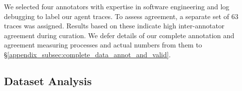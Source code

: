 \documentclass[11pt]{article}
\begin{document}
We selected four annotators with expertise in software engineering and log debugging to label our agent traces. To assess agreement, a separate set of 63 traces was assigned. Results based on these indicate high inter-annotator agreement during curation. We defer details of our complete annotation and agreement measuring processes and actual numbers from them to \S\ref{appendix_subsec:complete_data_annot_and_valid}.



\subsection{Dataset Analysis}

\end{document}
